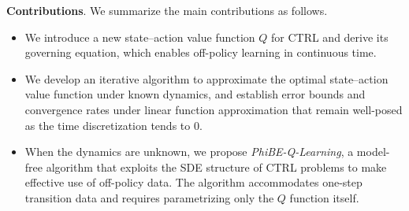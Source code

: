 \documentclass[12pt]{article}
\begin{document}




\textbf{Contributions}. We summarize the main contributions as follows.
\begin{itemize}
    \item We introduce a new state--action value function $Q$ for CTRL and derive its governing equation, which enables off-policy learning in continuous time.
    \item We develop an iterative algorithm to approximate the optimal state--action value function under known dynamics, and establish error bounds and convergence rates under linear function approximation that remain well-posed as the time discretization tends to $0$.
    \item 
    When the dynamics are unknown, we propose \textit{PhiBE-Q-Learning}, a model-free algorithm that exploits the SDE structure of CTRL problems to make effective use of off-policy data. The algorithm accommodates one-step transition data and requires parametrizing only the $Q$ function itself.
\end{itemize}
\end{document}
